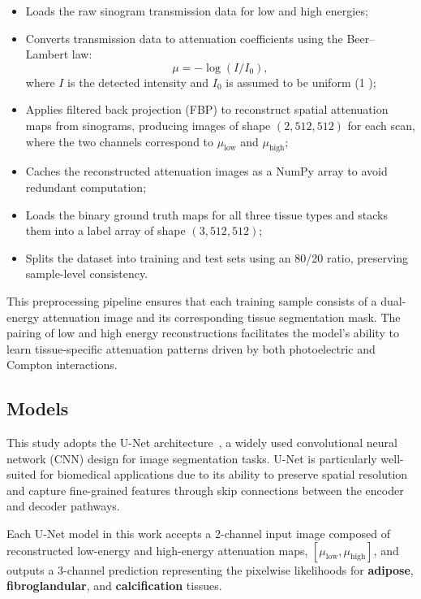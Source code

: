 \begin{itemize}
    \item Loads the raw sinogram transmission data for low and high energies;
    \item Converts transmission data to attenuation coefficients using the Beer–Lambert law:
    \[
        \mu = -\log(I / I_0),
    \]
    where $I$ is the detected intensity and $I_0$ is assumed to be uniform (1 );
    \item Applies filtered back projection (FBP) to reconstruct spatial attenuation maps from sinograms, 
          producing images of shape $(2, 512, 512)$ for each scan, where the two channels correspond to 
          $\mu_{\text{low}}$ and $\mu_{\text{high}}$;
    \item Caches the reconstructed attenuation images as a NumPy array to avoid redundant computation;
    \item Loads the binary ground truth maps for all three tissue types and stacks them into a label array of shape $(3, 512, 512)$;
    \item Splits the dataset into training and test sets using an 80/20 ratio, preserving sample-level consistency.
\end{itemize}

This preprocessing pipeline ensures that each training sample consists of a dual-energy attenuation image and its 
corresponding tissue segmentation mask. The pairing of low and high energy reconstructions facilitates the model's 
ability to learn tissue-specific attenuation patterns driven by both photoelectric and Compton interactions.

\subsection{Models}

This study adopts the U-Net architecture~\cite{ronneberger2015unet}, a widely used convolutional neural network 
(CNN) design for image segmentation tasks. U-Net is particularly well-suited for biomedical applications due to 
its ability to preserve spatial resolution and capture fine-grained features through skip connections between the 
encoder and decoder pathways.

Each U-Net model in this work accepts a 2-channel input image composed of reconstructed low-energy and high-energy 
attenuation maps, \([\mu_{\text{low}}, \mu_{\text{high}}]\), and outputs a 3-channel prediction representing the 
pixelwise likelihoods for \textbf{adipose}, \textbf{fibroglandular}, and \textbf{calcification} tissues.

